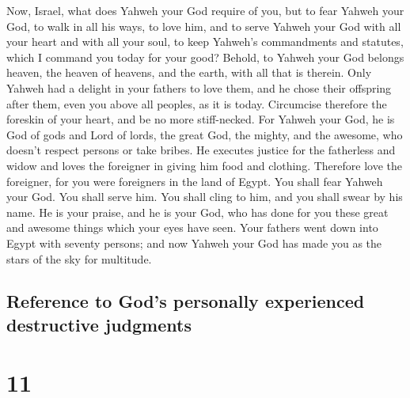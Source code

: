  Now, Israel, what does Yahweh your God require of you,
but to fear Yahweh your God, to walk in all his ways, to love him, and
to serve Yahweh your God with all your heart and with all your soul,
 to keep Yahweh's commandments and statutes, which I
command you today for your good?  Behold, to Yahweh your
God belongs heaven, the heaven of heavens, and the earth, with all that
is therein.  Only Yahweh had a delight in your fathers to
love them, and he chose their offspring after them, even you above all
peoples, as it is today.  Circumcise therefore the
foreskin of your heart, and be no more stiff-necked.  For
Yahweh your God, he is God of gods and Lord of lords, the great God, the
mighty, and the awesome, who doesn't respect persons or take bribes.
 He executes justice for the fatherless and widow and
loves the foreigner in giving him food and clothing. 
Therefore love the foreigner, for you were foreigners in the land of
Egypt.  You shall fear Yahweh your God. You shall serve
him. You shall cling to him, and you shall swear by his name.
 He is your praise, and he is your God, who has done for
you these great and awesome things which your eyes have seen.
 Your fathers went down into Egypt with seventy persons;
and now Yahweh your God has made you as the stars of the sky for
multitude.

\hypertarget{reference-to-gods-personally-experienced-destructive-judgments}{%
\subsection{Reference to God's personally experienced destructive
judgments}\label{reference-to-gods-personally-experienced-destructive-judgments}}

\hypertarget{section-10}{%
\section{11}\label{section-10}}


